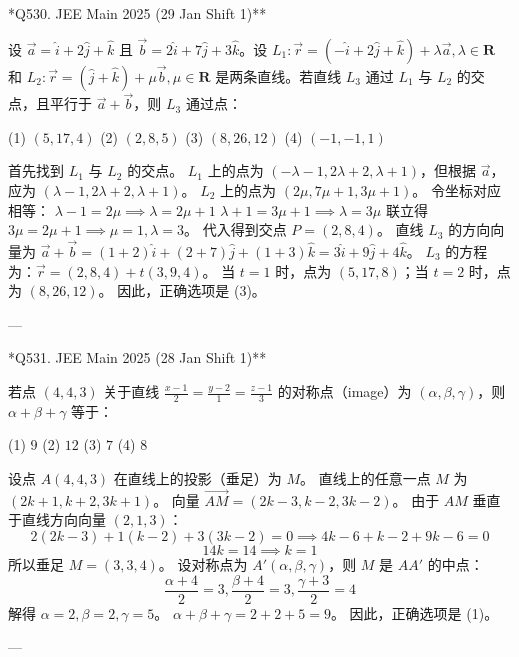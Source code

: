\begin{questions}
\question **Q530. JEE Main 2025 (29 Jan Shift 1)**

设 $\vec{a} = \hat{i} + 2\hat{j} + \hat{k}$ 且 $\vec{b} = 2\hat{i} + 7\hat{j} + 3\hat{k}$。设 $L_1 : \vec{r} = (-\hat{i} + 2\hat{j} + \hat{k}) + \lambda\vec{a}, \lambda \in \mathbf{R}$ 和 $L_2 : \vec{r} = (\hat{j} + \hat{k}) + \mu\vec{b}, \mu \in \mathbf{R}$ 是两条直线。若直线 $L_3$ 通过 $L_1$ 与 $L_2$ 的交点，且平行于 $\vec{a} + \vec{b}$，则 $L_3$ 通过点：

(1) $(5, 17, 4)$ \quad (2) $(2, 8, 5)$ \quad (3) $(8, 26, 12)$ \quad (4) $(-1, -1, 1)$

\begin{solution}
首先找到 $L_1$ 与 $L_2$ 的交点。
$L_1$ 上的点为 $(-\lambda-1, 2\lambda+2, \lambda+1)$，但根据 $\vec{a}$，应为 $(\lambda-1, 2\lambda+2, \lambda+1)$。
$L_2$ 上的点为 $(2\mu, 7\mu+1, 3\mu+1)$。
令坐标对应相等：
$\lambda - 1 = 2\mu \implies \lambda = 2\mu + 1$
$\lambda + 1 = 3\mu + 1 \implies \lambda = 3\mu$
联立得 $3\mu = 2\mu + 1 \implies \mu = 1, \lambda = 3$。
代入得到交点 $P = (2, 8, 4)$。
直线 $L_3$ 的方向向量为 $\vec{a} + \vec{b} = (1+2)\hat{i} + (2+7)\hat{j} + (1+3)\hat{k} = 3\hat{i} + 9\hat{j} + 4\hat{k}$。
$L_3$ 的方程为：$\vec{r} = (2, 8, 4) + t(3, 9, 4)$。
当 $t=1$ 时，点为 $(5, 17, 8)$；当 $t=2$ 时，点为 $(8, 26, 12)$。
因此，正确选项是 (3)。
\end{solution}

---

\question **Q531. JEE Main 2025 (28 Jan Shift 1)**

若点 $(4, 4, 3)$ 关于直线 $\frac{x-1}{2} = \frac{y-2}{1} = \frac{z-1}{3}$ 的对称点（image）为 $(\alpha, \beta, \gamma)$，则 $\alpha + \beta + \gamma$ 等于：

(1) $9$ \quad (2) $12$ \quad (3) $7$ \quad (4) $8$

\begin{solution}
设点 $A(4, 4, 3)$ 在直线上的投影（垂足）为 $M$。
直线上的任意一点 $M$ 为 $(2k+1, k+2, 3k+1)$。
向量 $\vec{AM} = (2k-3, k-2, 3k-2)$。
由于 $AM$ 垂直于直线方向向量 $(2, 1, 3)$：
\[
2(2k-3) + 1(k-2) + 3(3k-2) = 0 \implies 4k - 6 + k - 2 + 9k - 6 = 0
\]
\[
14k = 14 \implies k = 1
\]
所以垂足 $M = (3, 3, 4)$。
设对称点为 $A'(\alpha, \beta, \gamma)$，则 $M$ 是 $AA'$ 的中点：
\[
\frac{\alpha+4}{2} = 3, \frac{\beta+4}{2} = 3, \frac{\gamma+3}{2} = 4
\]
解得 $\alpha = 2, \beta = 2, \gamma = 5$。
$\alpha + \beta + \gamma = 2 + 2 + 5 = 9$。
因此，正确选项是 (1)。
\end{solution}

---


\end{questions}
